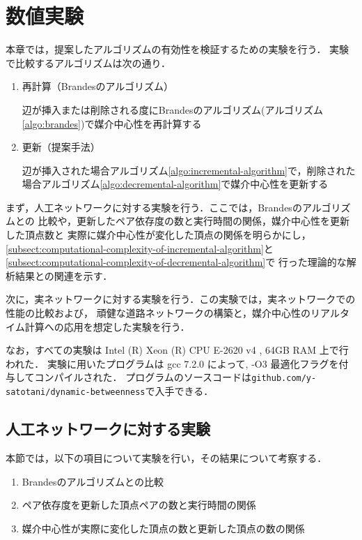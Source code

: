 \chapter{数値実験}
\label{chap:experiment}

本章では，提案したアルゴリズムの有効性を検証するための実験を行う．
実験で比較するアルゴリズムは次の通り．
\begin{enumerate}
\item 再計算（Brandesのアルゴリズム）
  \par 辺が挿入または削除される度にBrandesのアルゴリズム(アルゴリズム\ref{algo:brandes})で媒介中心性を再計算する
\item 更新（提案手法）
  \par 辺が挿入された場合アルゴリズム\ref{algo:incremental-algorithm}で，削除された場合アルゴリズム\ref{algo:decremental-algorithm}で媒介中心性を更新する
\end{enumerate}

まず，人工ネットワークに対する実験を行う．ここでは，Brandesのアルゴリズムとの
比較や，更新したペア依存度の数と実行時間の関係，媒介中心性を更新した頂点数と
実際に媒介中心性が変化した頂点の関係を明らかにし，
\ref{subsect:computational-complexity-of-incremental-algorithm}と
\ref{subsect:computational-complexity-of-decremental-algorithm}で
行った理論的な解析結果との関連を示す．

次に，実ネットワークに対する実験を行う．この実験では，実ネットワークでの性能の比較および，
頑健な道路ネットワークの構築と，媒介中心性のリアルタイム計算への応用を想定した実験を行う．

なお，すべての実験は Intel (R) Xeon (R) CPU E-2620 v4 , 64GB RAM 上で行われた．
実験に用いたプログラムは gcc 7.2.0 によって, -O3 最適化フラグを付与してコンパイルされた．
プログラムのソースコードは\verb|github.com/y-satotani/dynamic-betweenness|で入手できる．

\section{人工ネットワークに対する実験}
\label{sect:exp-artificial}

本節では，以下の項目について実験を行い，その結果について考察する．
\begin{enumerate}
\item Brandesのアルゴリズムとの比較
\item ペア依存度を更新した頂点ペアの数と実行時間の関係
\item 媒介中心性が実際に変化した頂点の数と更新した頂点の数の関係
\end{enumerate}

